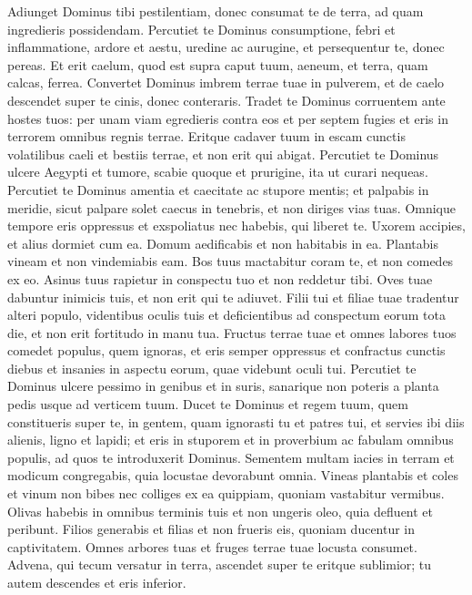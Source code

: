 \begin{biblechapter}
\verse Adiunget Dominus tibi pestilentiam, donec consumat te de terra, ad quam ingredieris possidendam.  
\verse Percutiet te Dominus consumptione, febri et inflammatione, ardore et aestu, uredine ac aurugine, et persequentur te, donec pereas. 
\verse Et erit caelum, quod est supra caput tuum, aeneum, et terra, quam calcas, ferrea. 
\verse Convertet Dominus imbrem terrae tuae in pulverem, et de caelo descendet super te cinis, donec conteraris. 
\verse Tradet te Dominus corruentem ante hostes tuos: per unam viam egredieris contra eos et per septem fugies et eris in terrorem omnibus regnis terrae. 
\verse Eritque cadaver tuum in escam cunctis volatilibus caeli et bestiis terrae, et non erit qui abigat. 
\verse Percutiet te Dominus ulcere Aegypti et tumore, scabie quoque et prurigine, ita ut curari nequeas. 
\verse Percutiet te Dominus amentia et caecitate ac stupore mentis; 
\verse et palpabis in meridie, sicut palpare solet caecus in tenebris, et non diriges vias tuas. Omnique tempore eris oppressus et exspoliatus nec habebis, qui liberet te. 
\verse Uxorem accipies, et alius dormiet cum ea. Domum aedificabis et non habitabis in ea. Plantabis vineam et non vindemiabis eam. 
\verse Bos tuus mactabitur coram te, et non comedes ex eo. Asinus tuus rapietur in conspectu tuo et non reddetur tibi. Oves tuae dabuntur inimicis tuis, et non erit qui te adiuvet. 
\verse Filii tui et filiae tuae tradentur alteri populo, videntibus oculis tuis et deficientibus ad conspectum eorum tota die, et non erit fortitudo in manu tua. 
\verse Fructus terrae tuae et omnes labores tuos comedet populus, quem ignoras, et eris semper oppressus et confractus cunctis diebus 
\verse et insanies in aspectu eorum, quae videbunt oculi tui. 
\verse Percutiet te Dominus ulcere pessimo in genibus et in suris, sanarique non poteris a planta pedis usque ad verticem tuum. 
\verse Ducet te Dominus et regem tuum, quem constitueris super te, in gentem, quam ignorasti tu et patres tui, et servies ibi diis alienis, ligno et lapidi; 
\verse et eris in stuporem et in proverbium ac fabulam omnibus populis, ad quos te introduxerit Dominus. 
\verse Sementem multam iacies in terram et modicum congregabis, quia locustae devorabunt omnia. 
\verse Vineas plantabis et coles et vinum non bibes nec colliges ex ea quippiam, quoniam vastabitur vermibus. 
\verse Olivas habebis in omnibus terminis tuis et non ungeris oleo, quia defluent et peribunt. 
\verse Filios generabis et filias et non frueris eis, quoniam ducentur in captivitatem.  
\verse Omnes arbores tuas et fruges terrae tuae locusta consumet. 
\verse Advena, qui tecum versatur in terra, ascendet super te eritque sublimior; tu autem descendes et eris inferior. 

\end{biblechapter}
